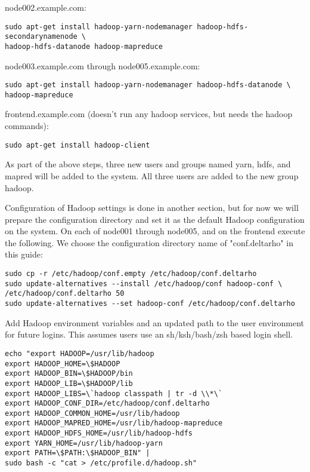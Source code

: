 node002.example.com:
\begin{verbatim}
sudo apt-get install hadoop-yarn-nodemanager hadoop-hdfs-secondarynamenode \
hadoop-hdfs-datanode hadoop-mapreduce
\end{verbatim}

node003.example.com through node005.example.com:
\begin{verbatim}
sudo apt-get install hadoop-yarn-nodemanager hadoop-hdfs-datanode \
hadoop-mapreduce
\end{verbatim}

frontend.example.com (doesn't run any hadoop services, but needs the hadoop commands):
\begin{verbatim}
sudo apt-get install hadoop-client
\end{verbatim}

As part of the above steps, three new users and groups named yarn, hdfs,
and mapred will be added to the system.  All three users are added to
the new group hadoop.

Configuration of Hadoop settings is done in another section, but for now
we will prepare the configuration directory and set it as the default
Hadoop configuration on the system.  On each of node001 through node005,
and on the frontend execute the following.  We choose the configuration
directory name of "conf.deltarho" in this guide:

\begin{verbatim}
sudo cp -r /etc/hadoop/conf.empty /etc/hadoop/conf.deltarho
sudo update-alternatives --install /etc/hadoop/conf hadoop-conf \
/etc/hadoop/conf.deltarho 50
sudo update-alternatives --set hadoop-conf /etc/hadoop/conf.deltarho
\end{verbatim}


Add Hadoop environment variables and an updated path to the user environment for future logins.  This assumes users use an sh/ksh/bash/zsh based login shell.
\begin{verbatim}
echo "export HADOOP=/usr/lib/hadoop
export HADOOP_HOME=\$HADOOP
export HADOOP_BIN=\$HADOOP/bin
export HADOOP_LIB=\$HADOOP/lib
export HADOOP_LIBS=\`hadoop classpath | tr -d \\*\`
export HADOOP_CONF_DIR=/etc/hadoop/conf.deltarho
export HADOOP_COMMON_HOME=/usr/lib/hadoop
export HADOOP_MAPRED_HOME=/usr/lib/hadoop-mapreduce
export HADOOP_HDFS_HOME=/usr/lib/hadoop-hdfs
export YARN_HOME=/usr/lib/hadoop-yarn
export PATH=\$PATH:\$HADOOP_BIN" |
sudo bash -c "cat > /etc/profile.d/hadoop.sh"
\end{verbatim}

